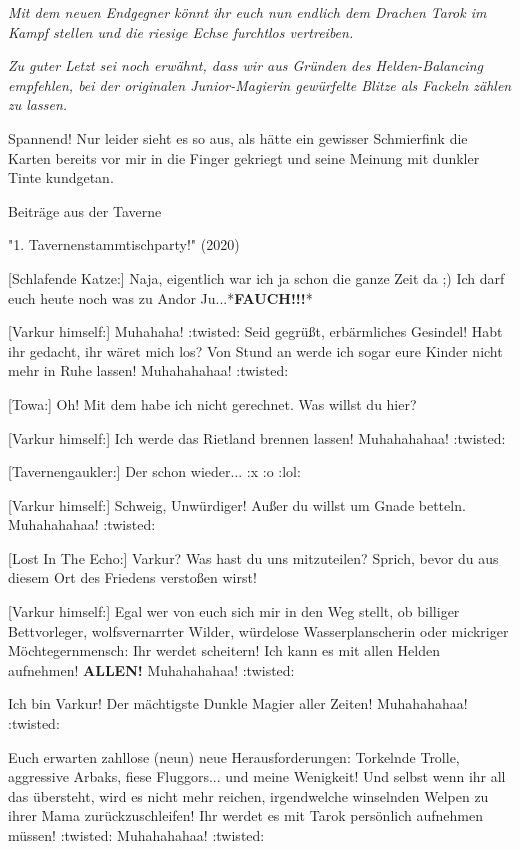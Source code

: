 {\textit{Mit dem neuen Endgegner könnt ihr euch nun endlich dem Drachen Tarok im Kampf stellen und die riesige Echse furchtlos vertreiben.}

\textit{Zu guter Letzt sei noch erwähnt, dass wir aus Gründen des Helden-Balancing empfehlen, bei der originalen Junior-Magierin gewürfelte Blitze als Fackeln zählen zu lassen.}

Spannend! Nur leider sieht es so aus, als hätte ein gewisser Schmierfink die Karten bereits vor mir in die Finger gekriegt und seine Meinung mit dunkler Tinte kundgetan.


\begin{center}
    Beiträge aus der Taverne

    "1. Tavernenstammtischparty!" (2020)
\end{center}

[Schlafende Katze:] Naja, eigentlich war ich ja schon die ganze Zeit da ;) Ich darf euch heute noch was zu Andor Ju...*\textbf{FAUCH!!!}*

[Varkur himself:] Muhahaha! :twisted: Seid gegrüßt, erbärmliches Gesindel! Habt ihr gedacht, ihr wäret mich los? Von Stund an werde ich sogar eure Kinder nicht mehr in Ruhe lassen! {\footnotesize Muhahahahaa! :twisted:}

[Towa:] Oh! Mit dem habe ich nicht gerechnet. Was willst du hier?

[Varkur himself:] Ich werde das Rietland brennen lassen! {\footnotesize Muhahahahaa! :twisted:}

[Tavernengaukler:] Der schon wieder... :x :o :lol:

[Varkur himself:] Schweig, Unwürdiger! Außer du willst um Gnade betteln. {\footnotesize Muhahahahaa! :twisted:}

[Lost In The Echo:] Varkur? Was hast du uns mitzuteilen? Sprich, bevor du aus diesem Ort des Friedens verstoßen wirst!

[Varkur himself:] Egal wer von euch sich mir in den Weg stellt, ob billiger Bettvorleger, wolfsvernarrter Wilder, würdelose Wasserplanscherin oder mickriger Möchtegernmensch: Ihr werdet scheitern! Ich kann es mit allen Helden aufnehmen! \textbf{ALLEN!} {\footnotesize Muhahahahaa! :twisted:}

Ich bin Varkur! Der mächtigste Dunkle Magier aller Zeiten! {\footnotesize Muhahahahaa! :twisted:}

Euch erwarten zahllose (neun) neue Herausforderungen: Torkelnde Trolle, aggressive Arbaks, fiese Fluggors... und meine Wenigkeit! Und selbst wenn ihr all das übersteht, wird es nicht mehr reichen, irgendwelche winselnden Welpen zu ihrer Mama zurückzuschleifen! Ihr werdet es mit Tarok persönlich aufnehmen müssen! :twisted: {\footnotesize Muhahahahaa! :twisted:}

}
